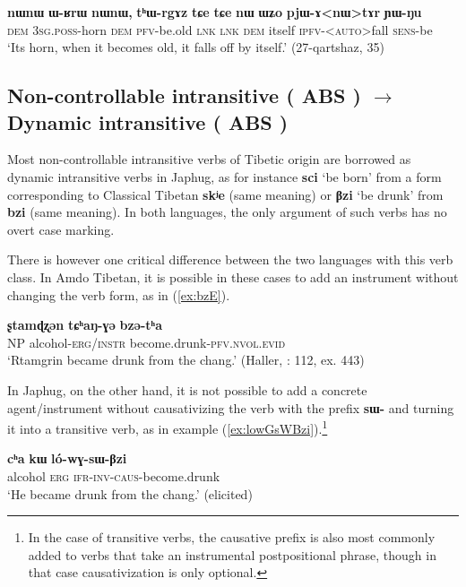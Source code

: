 \documentclass[oneside,a4paper,11pt]{article}
\makeatletter
\newcommand{\ipa}[1]{{\phon\textbf{\mbox{#1}}}} %
\newcommand{\refb}[1]{(\ref{#1})}
\def\fakesc#1{%
  \begingroup%
  \xdef\fake@name{\csname\curr@fontshape/\f@size\endcsname}%
  \fontsize{\fontdimen8\fake@name}{\baselineskip}\selectfont%
  \uppercase{#1}%
  \endgroup%
}
\makeatother
\begin{document}
\begin{exe}
\ex \label{ex:thWrgAz}
\gll
\ipa{nɯnɯ}  	\ipa{ɯ-ʁrɯ}  	\ipa{nɯnɯ,}  	\ipa{tʰɯ-rgɤz}  	\ipa{tɕe}  	\ipa{tɕe}  	\ipa{nɯ}  	\ipa{ɯʑo}  	\ipa{pjɯ-ɤ<nɯ>tɤr}  	\ipa{ɲɯ-ŋu}  \\
\textsc{dem} \textsc{3sg.poss}-horn \textsc{dem} \textsc{pfv}-be.old \textsc{lnk}  \textsc{lnk} \textsc{dem} itself \textsc{ipfv}-<\textsc{auto}>fall \textsc{sens}-be \\
\glt `Its horn, when it becomes old, it falls off by itself.' (27-qartshaz, 35)
\end{exe}


\subsection{Non-controllable intransitive (\fakesc{abs}) $\rightarrow$ Dynamic intransitive (\fakesc{abs})}  
Most non-controllable intransitive verbs of Tibetic origin are borrowed as dynamic intransitive verbs in Japhug, as for instance \ipa{sci} `be born' from a form corresponding to Classical Tibetan \ipa{skʲe} (same meaning) or \ipa{βzi} `be drunk' from \ipa{bzi} (same meaning). In both languages, the only argument of such verbs has no overt case marking.

There is however one critical difference between the two languages with this verb class. In Amdo Tibetan, it is possible in these cases to add an instrument without changing the verb form, as in \refb{ex:bzE}.

\begin{exe}
\ex \label{ex:bzE}
\gll
\ipa{ʂtamɖʐən} 	\ipa{tɕʰaŋ-ɣə} \ipa{bzə-tʰa} 	 \\
NP alcohol-\textsc{erg/instr} become.drunk-\textsc{pfv.nvol.evid} \\
\glt `Rtamgrin became drunk from the chang.' (Haller, \citeyear{haller04themchen}: 112, ex. 443)
\end{exe}

In Japhug, on the other hand, it is not possible to add a concrete agent/instrument without causativizing the verb with the prefix \ipa{sɯ-} and turning it into a transitive verb, as in example \refb{ex:lowGsWBzi}.\footnote{In the case of transitive verbs, the causative prefix is also most commonly added to verbs that take an instrumental postpositional phrase, though in that case causativization is only optional.}

\begin{exe}
\ex \label{ex:lowGsWBzi}
\gll
\ipa{cʰa} 	\ipa{kɯ} 	\ipa{ló-wɣ-sɯ-βzi} \\ 
alcohol \textsc{erg} \textsc{ifr-inv-caus}-become.drunk \\
\glt `He became drunk from the chang.' (elicited)
\end{exe}
\end{document}
